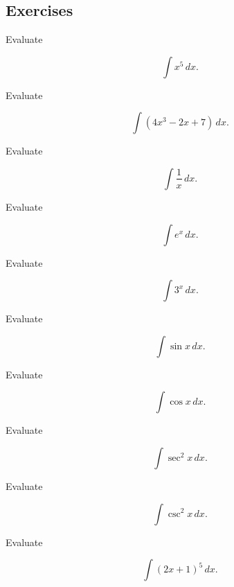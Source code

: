 \subsection{Exercises}
\label{subsec:integral-table-exercises}

\begin{exercise}[1]
Evaluate

\[
\int x^5\,dx.
\]
\end{exercise}

\begin{exercise}[1]
Evaluate

\[
\int
(4x^3-2x+7)
\,dx.
\]
\end{exercise}

\begin{exercise}[1]
Evaluate

\[
\int\frac1x\,dx.
\]
\end{exercise}

\begin{exercise}[1]
Evaluate

\[
\int e^x\,dx.
\]
\end{exercise}

\begin{exercise}[1]
Evaluate

\[
\int 3^x\,dx.
\]
\end{exercise}

\begin{exercise}[1]
Evaluate

\[
\int\sin x\,dx.
\]
\end{exercise}

\begin{exercise}[1]
Evaluate

\[
\int\cos x\,dx.
\]
\end{exercise}

\begin{exercise}[1]
Evaluate

\[
\int\sec^2x\,dx.
\]
\end{exercise}

\begin{exercise}[1]
Evaluate

\[
\int\csc^2x\,dx.
\]
\end{exercise}

\begin{exercise}[2]
Evaluate

\[
\int
(2x+1)^5
\,dx.
\]
\end{exercise}

